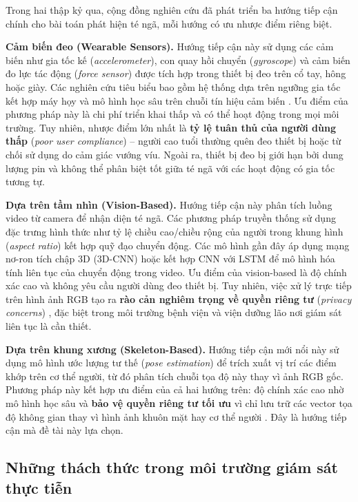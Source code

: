 Trong hai thập kỷ qua, cộng đồng nghiên cứu đã phát triển ba hướng tiếp cận chính cho bài toán phát hiện té ngã, mỗi hướng có ưu nhược điểm riêng biệt.

\textbf{Cảm biến đeo (Wearable Sensors).} Hướng tiếp cận này sử dụng các cảm biến như gia tốc kế (\textit{accelerometer}), con quay hồi chuyển (\textit{gyroscope}) và cảm biến đo lực tác động (\textit{force sensor}) được tích hợp trong thiết bị đeo trên cổ tay, hông hoặc giày. Các nghiên cứu tiêu biểu bao gồm hệ thống dựa trên ngưỡng gia tốc kết hợp máy họy \cite{pham2025lightweight} và mô hình học sâu trên chuỗi tín hiệu cảm biến \cite{khawam2025fall}. Ưu điểm của phương pháp này là chi phí triển khai thấp và có thể hoạt động trong mọi môi trường. Tuy nhiên, nhược điểm lớn nhất là \textbf{tỷ lệ tuân thủ của người dùng thấp} (\textit{poor user compliance}) -- người cao tuổi thường quên đeo thiết bị hoặc từ chối sử dụng do cảm giác vướng víu. Ngoài ra, thiết bị đeo bị giới hạn bởi dung lượng pin và không thể phân biệt tốt giữa té ngã với các hoạt động có gia tốc tương tự.

\textbf{Dựa trên tầm nhìn (Vision-Based).} Hướng tiếp cận này phân tích luồng video từ camera để nhận diện té ngã. Các phương pháp truyền thống sử dụng đặc trưng hình thức như tỷ lệ chiều cao/chiều rộng của người trong khung hình (\textit{aspect ratio}) kết hợp quỹ đạo chuyển động. Các mô hình gần đây áp dụng mạng nơ-ron tích chập 3D (3D-CNN) \cite{benabdennour2026real} hoặc kết hợp CNN với LSTM để mô hình hóa tính liên tục của chuyển động trong video. Ưu điểm của vision-based là độ chính xác cao và không yêu cầu người dùng đeo thiết bị. Tuy nhiên, việc xử lý trực tiếp trên hình ảnh RGB tạo ra \textbf{rào cản nghiêm trọng về quyền riêng tư} (\textit{privacy concerns}) \cite{ursul2024dynamic}, đặc biệt trong môi trường bệnh viện và viện dưỡng lão nơi giám sát liên tục là cần thiết.

\textbf{Dựa trên khung xương (Skeleton-Based).} Hướng tiếp cận mới nổi này sử dụng mô hình ước lượng tư thế (\textit{pose estimation}) để trích xuất vị trí các điểm khớp trên cơ thể người, từ đó phân tích chuỗi tọa độ này thay vì ảnh RGB gốc. Phương pháp này kết hợp ưu điểm của cả hai hướng trên: độ chính xác cao nhờ mô hình học sâu và \textbf{bảo vệ quyền riêng tư tối ưu} vì chỉ lưu trữ các vector tọa độ không gian thay vì hình ảnh khuôn mặt hay cơ thể người \cite{khani2024skeleton}. Đây là hướng tiếp cận mà đề tài này lựa chọn.

\subsection{Những thách thức trong môi trường giám sát thực tiễn}
\label{sec:fall_detection_challenges}

